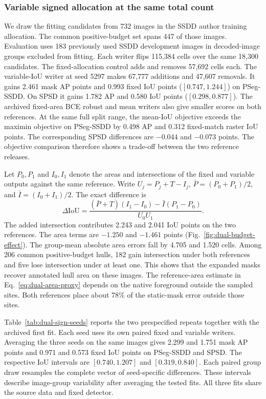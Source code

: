 \documentclass[journal]{IEEEtran}
\begin{document}
\subsubsection{Variable signed allocation at the same total count}
\label{sec:variable-sign-results}
We draw the fitting candidates from 732 images in the SSDD author training allocation. The common positive-budget set spans 447 of those images. Evaluation uses 183 previously used SSDD development images in decoded-image groups excluded from fitting. Each writer flips 115,384 cells over the same 18,300 candidates. The fixed-allocation control adds and removes 57,692 cells each. The variable-IoU writer at seed 5297 makes 67,777 additions and 47,607 removals. It gains 2.461 mask AP points and 0.993 fixed IoU points (\([0.747,1.244]\)) on PSeg-SSDD. On SPSD it gains 1.782 AP and 0.580 IoU points (\([0.298,0.877]\)). The archived fixed-area BCE robust and mean writers also give smaller scores on both references. At the same full split range, the mean-IoU objective exceeds the maximin objective on PSeg-SSDD by 0.498 AP and 0.312 fixed-match raster IoU points. The corresponding SPSD differences are \(-0.044\) and \(-0.073\) points. The objective comparison therefore shows a trade-off between the two reference releases.

Let \(P_0,P_1\) and \(I_0,I_1\) denote the areas and intersections of the fixed and variable outputs against the same reference. Write \(U_j=P_j+T-I_j\), \(\bar P=(P_0+P_1)/2\), and \(\bar I=(I_0+I_1)/2\). The exact difference is
\begin{equation}
 \Delta\mathrm{IoU} =
 \frac{(\bar P+T)(I_1-I_0)-\bar I(P_1-P_0)}{U_0 U_1}.
 \label{eq:area-overlap-parts}
\end{equation}
The added intersection contributes 2.243 and 2.041 IoU points on the two references. The area terms are \(-1.250\) and \(-1.461\) points (Fig.~\ref{fig:dual-budget-effect}). The group-mean absolute area errors fall by 4.705 and 1.520 cells. Among 206 common positive-budget hulls, 182 gain intersection under both references and five lose intersection under at least one. This shows that the expanded masks recover annotated hull area on these images. The reference-area estimate in Eq.~\eqref{eq:dual-area-proxy} depends on the native foreground outside the sampled sites. Both references place about 78\% of the static-mask error outside those sites.



Table~\ref{tab:dual-sign-seeds} reports the two prespecified repeats together with the archived first fit. Each seed uses its own paired fixed and variable writers. Averaging the three seeds on the same images gives 2.299 and 1.751 mask AP points and 0.971 and 0.573 fixed IoU points on PSeg-SSDD and SPSD. The respective IoU intervals are \([0.740,1.207]\) and \([0.319,0.840]\). Each paired group draw resamples the complete vector of seed-specific differences. These intervals describe image-group variability after averaging the tested fits. All three fits share the source data and fixed detector.
\end{document}
